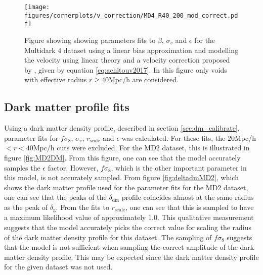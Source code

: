 \begin{figure}[H]
    \texttt{[image: figures/cornerplots/v\_correction/MD4\_R40\_200\_mod\_correct.pdf]}
    \caption{Figure showing showing parameters fits to $\beta$, $\sigma_v$ and $\epsilon$ for the Multidark 4 dataset using a linear bias approximation and modelling the velocity using linear theory and a velocity correction proposed by \cite{Achitouv_streaming}, given by equation \ref{eq:achitouv2017}. In this figure only voids with effective radius $r \geq 40$Mpc/h are considered.}
    \label{fig:linbiasMD4modR40}
\end{figure}

\subsection{Dark matter profile fits}
Using a dark matter density profile, described in section \ref{sec:dm_calibrate}, parameter fits for $f\sigma_8$, $\sigma_v$, $r_\mathrm{scale}$ and $\epsilon$ was calculated. For these fits, the $20$Mpc/h$<r<40$Mpc/h cuts were excluded. For the MD2 dataset, this is illustrated in figure \ref{fig:MD2DM}. From this figure, one can see that the model accurately samples the $\epsilon$ factor. However, $f\sigma_8$, which is the other important parameter in this model, is not accurately sampled. From figure \ref{fig:deltadmMD2}, which shows the dark matter profile used for the parameter fits for the MD2 dataset, one can see that the peaks of the $\delta_{\mathrm{dm}}$ profile coincides almost at the same radius as the peak of $\delta_\mathrm{g}$. From the fits to $r_\mathrm{scale}$, one can see that this is sampled to have a maximum likelihood value of approximately $1.0$. This qualitative measurement suggests that the model accurately picks the correct value for scaling the radius of the dark matter density profile for this dataset. The sampling of $f\sigma_8$ suggests that the model is not sufficient when sampling the correct amplitude of the dark matter density profile. This may be expected since the dark matter density profile for the given dataset was not used.\\\indent
